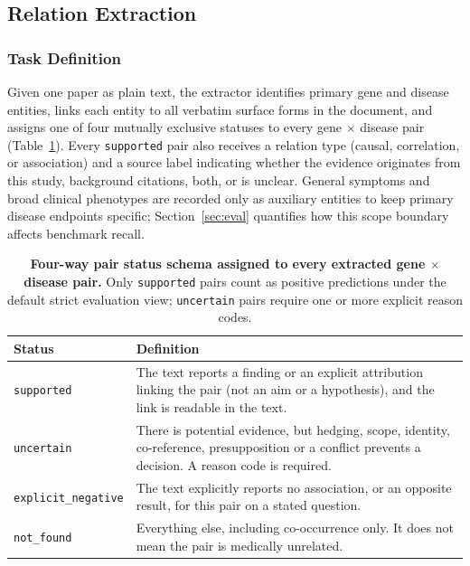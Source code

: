 \documentclass[preprint,10pt,letterpaper]{elsarticle}
\newcommand{\st}[1]{\texttt{#1}}             %
\begin{document}
\subsection{Relation Extraction}

\subsubsection{Task Definition}
Given one paper as plain text, the extractor identifies primary gene and disease entities, links each entity to all verbatim surface forms in the document, and assigns one of four mutually exclusive statuses to every gene $\times$ disease pair (Table~\ref{tab:status}). Every \st{supported} pair also receives a relation type (causal, correlation, or association) and a source label indicating whether the evidence originates from this study, background citations, both, or is unclear. General symptoms and broad clinical phenotypes are recorded only as auxiliary entities to keep primary disease endpoints specific; Section~\ref{sec:eval} quantifies how this scope boundary affects benchmark recall.

\begin{table}[!htbp]
\centering\footnotesize
\caption{\textbf{Four-way pair status schema assigned to every extracted gene $\times$ disease pair.} Only \st{supported} pairs count as positive predictions under the default strict evaluation view; \st{uncertain} pairs require one or more explicit reason codes.}
\label{tab:status}
\begin{tabularx}{\linewidth}{@{}lX@{}}
\toprule
Status & Definition\\
\midrule
\textcolor{stsup}{\st{supported}} & The text reports a finding or an explicit attribution linking the pair (not an aim or a hypothesis), and the link is readable in the text.\\
\textcolor{stunc}{\st{uncertain}} & There is potential evidence, but hedging, scope, identity, co-reference, presupposition or a conflict prevents a decision. A reason code is required.\\
\textcolor{stneg}{\st{explicit\_negative}} & The text explicitly reports no association, or an opposite result, for this pair on a stated question.\\
\textcolor{ink}{\st{not\_found}} & Everything else, including co-occurrence only. It does not mean the pair is medically unrelated.\\
\bottomrule
\end{tabularx}
\end{table}
\end{document}
